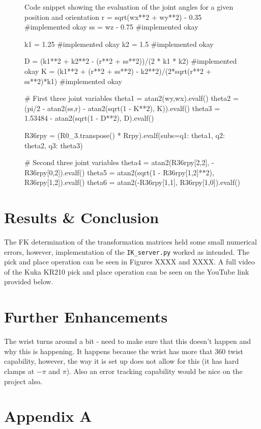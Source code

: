 \documentclass[a4paper]{article}
\begin{document}
\begin{figure}[h]\footnotesize
	\begin{sexylisting}{Code snippet showing the evaluation of the joint angles for a given position and orientation}
r = sqrt(wx**2 + wy**2) - 0.35 #implemented okay
ss = wz - 0.75 #implemented okay

k1 = 1.25 #implemented okay
k2 = 1.5 #implemented okay

D = (k1**2 + k2**2 - (r**2 + ss**2))/(2 * k1 * k2) #implemented okay
K = (k1**2 + (r**2 + ss**2) - k2**2)/(2*sqrt(r**2 + ss**2)*k1) #implemented okay

# First three joint variables
theta1 = atan2(wy,wx).evalf()
theta2 = (pi/2 - atan2(ss,r) - atan2(sqrt(1 - K**2), K)).evalf()
theta3 = 1.53484 - atan2(sqrt(1 - D**2), D).evalf()

R36rpy = (R0_3.transpose() * Rrpy).evalf(subs={q1: theta1, q2: theta2, q3: theta3})

# Second three joint variables
theta4 = atan2(R36rpy[2,2], -R36rpy[0,2]).evalf()
theta5 = atan2(sqrt(1 - R36rpy[1,2]**2), R36rpy[1,2]).evalf()
theta6 = atan2(-R36rpy[1,1], R36rpy[1,0]).evalf()
	\end{sexylisting}
\end{figure}

\newpage

\section{Results \& Conclusion}
The FK determination of the transformation matrices held some small numerical errors, however, implementation of the \verb|IK_server.py| worked as intended. The pick and place operation can be seen in Figures XXXX and XXXX. A full video of the Kuka KR210 pick and place operation can be seen on the YouTube link provided below.



\section{Further Enhancements}
The wrist turns around a bit - need to make sure that this doesn't happen and why this is happening. It happens because the wrist has more that 360 twist capability, however, the way it is set up does not allow for this (it has hard clamps at $-\pi$ and $\pi$). Also an error tracking capability would be nice on the project also.

\section{Appendix A}

\lstset{
	frame=single,
	basicstyle=\ttfamily,
	numbers=left,
	showstringspaces=false,
}

\tiny
%
\end{document}
